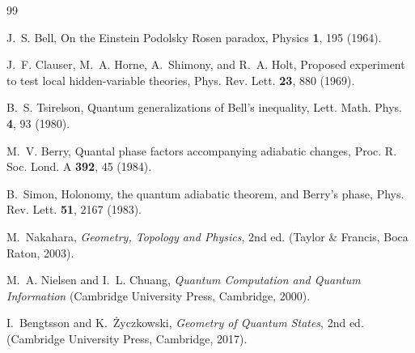 \documentclass[
  aps,
  pra,
  reprint,
  superscriptaddress,
  nofootinbib,
  longbibliography,
  floatfix,
  amsmath,
  amssymb
]{revtex4-2}
\theoremstyle{plain}
\theoremstyle{definition}
\theoremstyle{remark}
\begin{document}
\begin{thebibliography}{99}

J.~S. Bell,
On the Einstein Podolsky Rosen paradox,
Physics \textbf{1}, 195 (1964).

J.~F. Clauser, M.~A. Horne, A.~Shimony, and R.~A. Holt,
Proposed experiment to test local hidden-variable theories,
Phys. Rev. Lett. \textbf{23}, 880 (1969).

B.~S. Tsirelson,
Quantum generalizations of Bell's inequality,
Lett. Math. Phys. \textbf{4}, 93 (1980).

M.~V. Berry,
Quantal phase factors accompanying adiabatic changes,
Proc. R. Soc. Lond. A \textbf{392}, 45 (1984).

B.~Simon,
Holonomy, the quantum adiabatic theorem, and Berry's phase,
Phys. Rev. Lett. \textbf{51}, 2167 (1983).

M.~Nakahara,
\textit{Geometry, Topology and Physics}, 2nd ed.
(Taylor \& Francis, Boca Raton, 2003).

M.~A. Nielsen and I.~L. Chuang,
\textit{Quantum Computation and Quantum Information}
(Cambridge University Press, Cambridge, 2000).

I.~Bengtsson and K.~{\.{Z}}yczkowski,
\textit{Geometry of Quantum States}, 2nd ed.
(Cambridge University Press, Cambridge, 2017).

\end{thebibliography}
\end{document}
